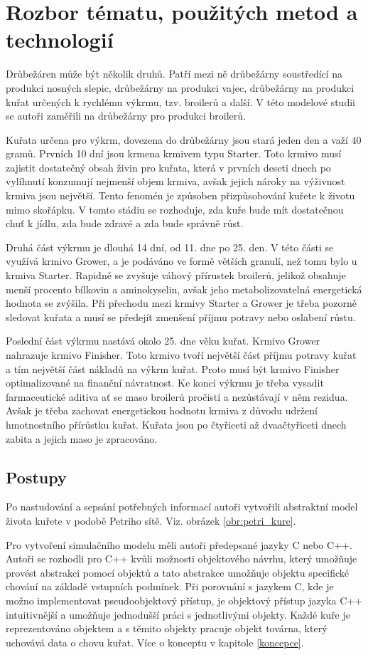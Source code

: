 \documentclass[a4paper,10pt]{article}
\begin{document}
%
%

\section{Rozbor tématu, použitých metod a technologií}\label{rozbor}
Drůbežáren může být několik druhů. Patří mezi ně drůbežárny soustředící 
na produkci nosných slepic, drůbežárny na produkci vajec, drůbežárny 
na produkci kuřat určených k rychlému výkrmu, tzv. broilerů a další.
V této modelové studii se autoři zaměřili na drůbežárny pro produkci broilerů.
\par
Kuřata určena pro výkrm, dovezena do drůbežárny jsou stará jeden den 
a važí 40 gramů. Prvních 10 dní jsou krmena krmivem typu Starter. Toto krmivo 
musí zajistit dostatečný obsah živin pro kuřata, která v prvních deseti dnech
po vylíhnutí konzumují nejmenší objem krmiva, avšak jejich nároky na výživnost krmiva
jsou největší. Tento fenomén je způsoben přizpůsobování kuřete k životu mimo skořápku.
V tomto stádiu se rozhoduje, zda kuře bude mít dostatečnou chuť k jídlu, zda bude zdravé
a zda bude správně růst.
\par
Druhá část výkrmu je dlouhá 14 dní, od 11. dne po 25. den. V této části se využívá krmivo
Grower, a je podáváno ve formě větších granulí, než tomu bylo u krmiva Starter.
Rapidně se zvyšuje váhový přírustek broilerů, jelikož obsahuje menší procento bílkovin
a aminokyselin, avšak jeho metabolizovatelná energetická hodnota se zvýšila. Při přechodu
mezi krmivy Starter a Grower je třeba pozorně sledovat kuřata a musí se předejít zmenšení
příjmu potravy nebo oslabení růstu.
\par
Poslední část výkrmu nastává okolo 25. dne věku kuřat. Krmivo Grower nahrazuje krmivo Finisher.
Toto krmivo tvoří největší část příjmu potravy kuřat a tím největší část nákladů na výkrm kuřat.
Proto musí být krmivo Finisher optimalizované na finanční návratnost. Ke konci výkrmu
je třeba vysadit farmaceutické aditiva ať se maso broilerů pročistí 
a nezůstávají v něm rezidua. Avšak je třeba zachovat energetickou hodnotu krmiva z důvodu
udržení hmotnostního přírůstku kuřat. Kuřata jsou po čtyřiceti až dvaačtyřiceti dnech zabita
a jejich maso je zpracováno.

\subsection{Postupy}\label{postupy}
Po nastudování a sepsání potřebných informací autoři vytvořili abstraktní model
života kuřete v podobě Petriho sítě\cite{petriho_sit}. Viz. obrázek \ref{obr:petri_kure}.
\par
Pro vytvoření simulačního modelu měli autoři předepsané jazyky C nebo C++. Autoři se rozhodli
pro C++ kvůli možnosti objektového návrhu, který umožňuje provést abstrakci pomocí objektů
a tato abstrakce umožňuje objektu specifické chování na základě vstupních podmínek.
Při porovnání s jazykem C, kde je možno implementovat pseudoobjektový přístup, je objektový 
přístup jazyka C++ intuitivnější a umožňuje jednodušší práci s jednotlivými objekty.
Každé kuře je reprezentováno objektem a s těmito objekty pracuje objekt továrna, který uchovává
data o chovu kuřat. Více o konceptu v kapitole \ref{koncepce}.
\end{document}
